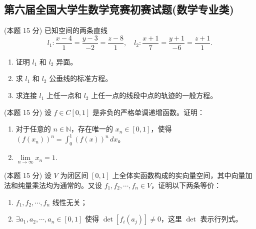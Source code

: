 \documentclass[loose]{ExBook}
\begin{document}
\subsection{第六届全国大学生数学竞赛初赛试题(数学专业类)}
\begin{qitems}
    \begin{bbox}
        \qitem (本题 15 分) 已知空间的两条直线
        \[ l_1: \frac{x-4}{1} = \frac{y-3}{-2} = \frac{z-8}{1}, \quad l_2: \frac{x+1}{7} = \frac{y+1}{-6} = \frac{z+1}{1}. \]
        
        \begin{enumerate}[label=(\arabic*)]
            \item 证明 \( l_1 \) 和 \( l_2 \) 异面。
            \item 求 \( l_1 \) 和 \( l_2 \) 公垂线的标准方程。
            \item 求连接 \( l_1 \) 上任一点和 \( l_2 \) 上任一点的线段中点的轨迹的一般方程。
        \end{enumerate}
    \end{bbox}

    \begin{bbox}
        \qitem (本题 15 分) 设 \( f \in C[0,1] \) 是非负的严格单调递增函数。证明：
        
        \begin{enumerate}[label=(\arabic*)]
            \item 对于任意的 \( n \in \mathbb{N} \)，存在唯一的 \( x_n \in [0,1] \)，使得 \( (f(x_n))^n = \int_{0}^{1} (f(x))^n \, dx \)。
            \item \(\lim\limits_{n \to \infty} x_n = 1. \)
        \end{enumerate}
    \end{bbox}

    \begin{bbox}
        \qitem (本题 15 分) 设 \( V \) 为闭区间 \([0,1]\) 上全体实函数构成的实向量空间，其中向量加法和纯量乘法均为通常的。又设 \( f_1, f_2, \cdots, f_n \in V \)，证明以下两条等价：
        
        \begin{enumerate}[label=(\arabic*)]
            \item \( f_1, f_2, \cdots, f_n \) 线性无关；
            \item \(\exists a_1, a_2, \cdots, a_n \in [0,1] \) 使得 \( \det [f_i(a_j)] \neq 0 \)，这里 \( \det \) 表示行列式。
        \end{enumerate}
    \end{bbox}


\end{qitems}
\end{document}
